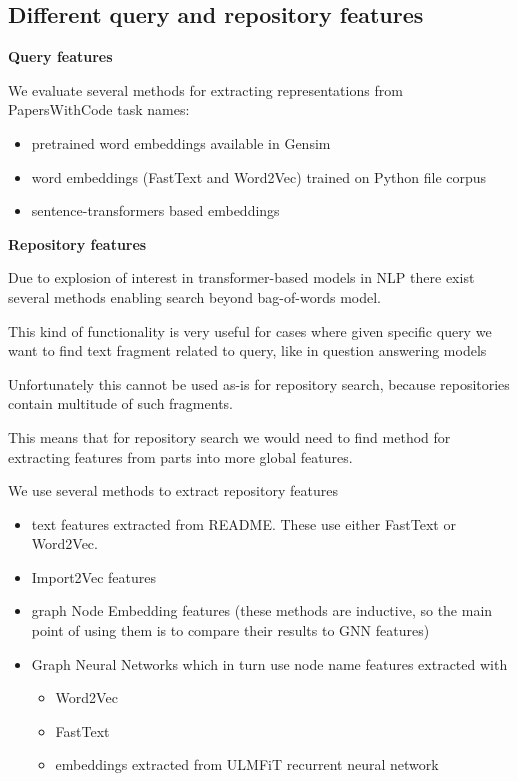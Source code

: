 \documentclass[longabstract,mgr,english]{iithesis}
\begin{document}
\subsection{Different query and repository features}

\textbf{Query features}


We evaluate several methods for extracting representations from PapersWithCode task names:
\begin{itemize}
\item pretrained word embeddings available in Gensim \cite{rehurek2011gensim}
\item word embeddings (FastText and Word2Vec) trained on Python file corpus
\item sentence-transformers based embeddings \cite{sentence_transformers}
\end{itemize}

\textbf{Repository features}

Due to explosion of interest in transformer-based models in NLP there exist several methods enabling search beyond bag-of-words model.

This kind of functionality is very useful for cases where given specific query we want to find text fragment related to query, like in question answering models

Unfortunately this cannot be used as-is for repository search, because repositories contain multitude of such fragments.

This means that for repository search we would need to find method  for extracting features from parts into more global features.

We use several methods to extract repository features
\begin{itemize}
    \item text features extracted from README. These use either FastText or Word2Vec.
    \item Import2Vec features
    \item graph Node Embedding features (these methods are inductive, so the main point of using them is to compare their results to GNN features)
    \item Graph Neural Networks which in turn use node name features extracted with 
      \begin{itemize}
        \item Word2Vec
        \item FastText
        \item {\color{red} embeddings extracted from ULMFiT recurrent neural network \cite{ulmfit}}
      \end{itemize}
\end{itemize}
\end{document}
